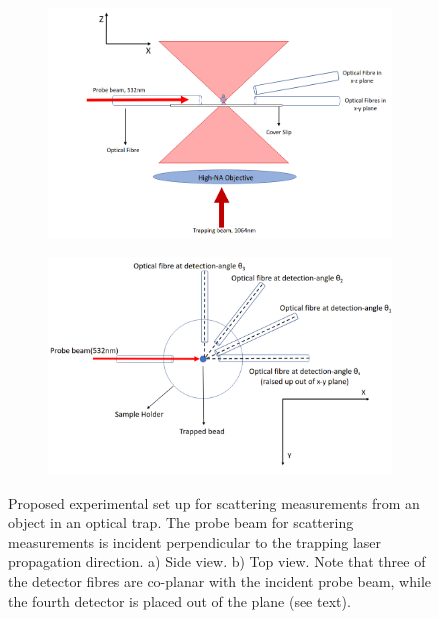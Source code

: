 \documentclass[final,  3p]{elsarticle}
\begin{document}
\begin{figure}
\centering
\begin{subfigure}{0.45\textwidth}
	\subcaption{}
	\includegraphics[width=\textwidth, height=0.25\textheight]{./Images/fig1a.png}
\end{subfigure}
\begin{subfigure}{0.45\textwidth}
	\subcaption{}
	\includegraphics[width=\textwidth, height=0.25\textheight]{./Images/fig1b.png}
\end{subfigure}
\caption{\label{fig:setup}
  Proposed experimental set up for scattering measurements from an object in an optical trap. The probe beam for scattering measurements is incident perpendicular to the trapping laser propagation direction. a) Side view. b) Top view. Note that three of the detector fibres are co-planar with the incident probe beam, while the fourth detector is placed out of the plane (see text).
%
}
\end{figure}
\end{document}
